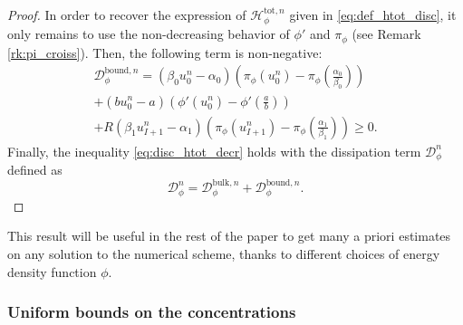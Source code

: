 \documentclass{amsart}
\renewcommand\H{\mathcal{H}_{\phi}}
\begin{document}
\begin{proof}
		In order to recover the expression of $\H^{{\text{tot}},n}$ given in \eqref{eq:def_htot_disc}, it only remains to use the non-decreasing behavior of $\phi'$ and $\pi_\phi$ (see Remark \ref{rk:pi_croiss}). Then, the following term is non-negative:
		\begin{multline}\label{eq:dbound}
			\mathcal{D}^{\text{bound}, n}_\phi = (\beta_0 u_0^n-\alpha_0 )\left(\pi_\phi(u_0^n) - \pi_\phi\left(\frac{\alpha_0}{\beta_0}\right)\right) \\
			+ (bu_0^n-a)\left(\phi'(u_0^n) - \phi'\left(\frac{a}{b}\right)\right) \\
			+R(\beta_1 u_{I+1}^n-\alpha_1)\left(\pi_\phi(u_{I+1}^n) - \pi_\phi\left(\frac{\alpha_1}{\beta_1}\right)\right) \geq 0.
		\end{multline}
		Finally, the  inequality \eqref{eq:disc_htot_decr} holds
		with the dissipation term $\mathcal{D}_{\phi}^n$ defined as 
		\begin{equation} \label{eq:disc_diss_term}
			\mathcal{D}_{\phi}^n =  \mathcal{D}_{\phi}^{\text{bulk},n} + \mathcal{D}^{\text{bound}, n}_\phi.
		\end{equation}
	\end{proof}
	This result will be useful in the rest of the paper to get many a priori estimates on any solution to the numerical scheme, thanks to different choices of energy density function $\phi$.

	\subsubsection{Uniform bounds on the concentrations}	
	
\end{document}
